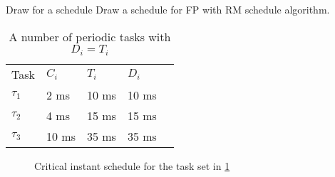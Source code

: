 \begin{exampleblock}{Draw for a schedule}
  Draw a schedule for FP with RM schedule algorithm.
\begin{table}[H]
  \centering
  \begin{tabular}{|l|lll|l}
      \cline{1-4}
      Task     & $C_i$  & $T_i$  & $D_i$  &  \\ \cline{1-4}
      $\tau_1$ & 2 ms  & 10 ms & 10 ms &  \\
      $\tau_2$ & 4 ms  & 15 ms & 15 ms &  \\
      $\tau_3$ & 10 ms & 35 ms & 35 ms &  \\ \cline{1-4}
  \end{tabular}
  \caption{A number of periodic tasks with $D_i = T_i$}
  \label{implicit_deadline_example}
\end{table}

\begin{figure}[H]
    \begin{RTGrid}[width=0.95\textwidth]{3}{40}
        
        
        
        
        

        
        
        
    \end{RTGrid}
  \caption{Critical instant schedule for the task set in \ref{implicit_deadline_example}}
\end{figure}
\end{exampleblock}

